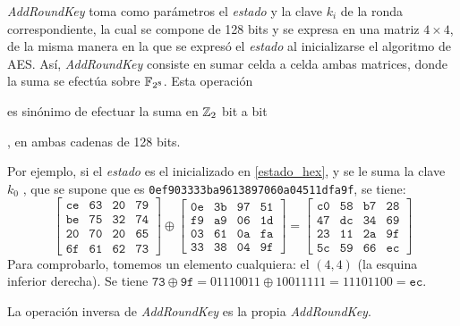 \textit{AddRoundKey} toma como parámetros el \textit{estado} y la clave $k_i$ de la ronda correspondiente, la cual se compone de 128 bits y se expresa en una matriz $4 \times 4$, de la misma manera en la que se expresó el \textit{estado} al inicializarse el algoritmo de AES. Así, \textit{AddRoundKey} consiste en sumar celda a celda ambas matrices, donde la suma se efectúa sobre $\mathbb{F}_{2^8}$. Esta operación \begin{Revision}es sinónimo de efectuar la suma en $\mathbb{Z}_2$ bit a bit\end{Revision}, en ambas cadenas de 128 bits.

\begin{Revision}
    Por ejemplo, si el \textit{estado} es el inicializado en \ref{estado_hex}, y se le suma la clave $k_0$ , que se supone que es \texttt{0ef903333ba9613897060a04511dfa9f}, se tiene:
    \[
    \begin{bmatrix}
        \texttt{ce} & \texttt{63} & \texttt{20} & \texttt{79} \\
        \texttt{be} & \texttt{75} & \texttt{32} & \texttt{74} \\
        \texttt{20} & \texttt{70} & \texttt{20} & \texttt{65} \\
        \texttt{6f} & \texttt{61} & \texttt{62} & \texttt{73}
    \end{bmatrix}
    \oplus
    \begin{bmatrix}
        \texttt{0e} & \texttt{3b} & \texttt{97} & \texttt{51} \\
        \texttt{f9} & \texttt{a9} & \texttt{06} & \texttt{1d} \\
        \texttt{03} & \texttt{61} & \texttt{0a} & \texttt{fa} \\
        \texttt{33} & \texttt{38} & \texttt{04} & \texttt{9f}
    \end{bmatrix}
    =
    \begin{bmatrix}
        \texttt{c0} & \texttt{58} & \texttt{b7} & \texttt{28} \\
        \texttt{47} & \texttt{dc} & \texttt{34} & \texttt{69} \\
        \texttt{23} & \texttt{11} & \texttt{2a} & \texttt{9f} \\
        \texttt{5c} & \texttt{59} & \texttt{66} & \texttt{ec}
    \end{bmatrix}
    \]
    Para comprobarlo, tomemos un elemento cualquiera: el $(4,4)$ (la esquina inferior derecha). Se tiene $\texttt{73} \oplus \texttt{9f} = 01110011 \oplus 10011111 = 11101100 = \texttt{ec}$.
\end{Revision}

La operación inversa de \textit{AddRoundKey} es la propia \textit{AddRoundKey}.
\vspace{-1em}
